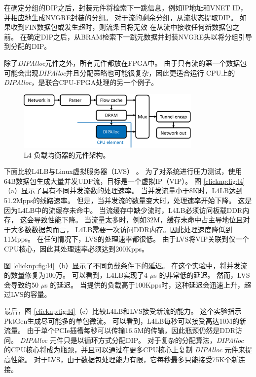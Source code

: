 在确定分组的DIP之后，封装元件将检索下一跳信息，例如IP地址和VNET ID，并相应地生成NVGRE封装的分组。
对于流的剩余分组，从流状态提取DIP。
如果收到FIN数据包或发生超时，则流条目将无效
在从流中接收任何新数据包之前。
在确定DIP之后，从BRAM检索下一跳元数据并封装NVGRE头以将分组引导到分配的DIP。

除了\textit {DIPAlloc}元件之外，所有元件都放在FPGA中。
由于只有流的第一个数据包可能会出现\textit {DIPAlloc}并且分配策略也可能很复杂，因此更适合运行
CPU上的\textit {DIPAlloc}，是联合CPU-FPGA处理的另一个例子。


\begin{figure}[htbp]
	\centering
	\includegraphics[width=0.8\textwidth]{image/L4LoadBalancer}
	\caption{L4 负载均衡器的元件架构。}
	\label{clicknp:fig:L4LB}
\end{figure}


下面比较L4LB与Linux虚拟服务器（LVS） \cite {lvs}。
为了对系统进行压力测试，使用64B数据包生成大量并发UDP流，目标是一个虚拟IP（VIP）。
图 \ref {clicknp:fig:l4}（a）显示了具有不同并发流数的处理速率。
当并发流量小于8K时，L4LB达到51.2Mpps的线路速率。
但是，当并发流的数量变大时，处理速率开始下降。
这是因为L4LB中的流缓存未命中。
当流缓存中缺少流时，L4LB必须访问板载DDR内存，
这会导致性能下降。
当流量太多时，例如32M，缓存未命中占主导地位且对于大多数数据包而言，
L4LB需要一次访问DDR内存。因此处理速度降低到11Mpps。
在任何情况下，LVS的处理速率都很低。
由于LVS将VIP关联到仅一个CPU核心，因此其处理速率必须达到200Kpps。

图 \ref {clicknp:fig:l4}（b）显示了不同负载条件下的延迟。
在这个实验中，将并发流的数量修复为100万。
可以看到，L4LB实现了4 $\mu$s 的非常低的延迟。
然而，LVS会导致约50 $\mu$s 的延迟。
当提供的负载高于100Kpps时，这种延迟会迅速上升，超过LVS的容量。

最后，图 \ref {clicknp:fig:l4}（c）比较L4LB和LVS接受新流的能力。
这个实验指示PktGen生成尽可能多的单包微流。
可以看到，L4LB每秒可以接受高达10M的新流量。
由于单个PCIe插槽每秒可以传输16.5M的传输，因此瓶颈仍然是DDR访问。
\textit {DIPAlloc} 元件只是以循环方式分配DIP。
对于复杂的分配算法，\textit {DIPAlloc} 的CPU核心将成为瓶颈，并且可以通过在更多CPU核心上复制 \textit {DIPAlloc} 元件来提高性能。
对于LVS，由于数据包处理能力有限，它每秒最多只能接受75K个新连接。


